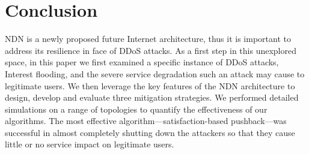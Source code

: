 \section{Conclusion}
\label{sec:conclusion}


%
%

NDN is a newly proposed future Internet architecture, thus it is important to address its resilience in face of DDoS attacks. As a first step in this unexplored space, in this paper we first examined a specific instance of DDoS attacks, Interest flooding, and the severe service degradation such an attack may cause to legitimate users. We then leverage the key features of the NDN architecture to design, develop and evaluate three mitigation strategies.
We performed detailed simulations on a range of topologies to quantify the effectiveness of our algorithms.   
The most effective algorithm---satisfaction-based pushback---was successful in almost completely shutting down the attackers so that they cause little or no service impact on legitimate users.

